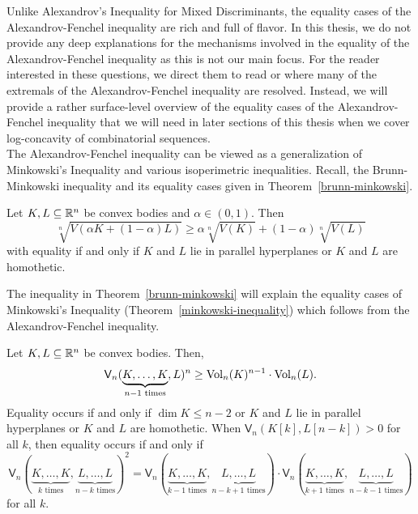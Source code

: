 \documentclass{puthesis-UG}
\begin{document}
Unlike Alexandrov's Inequality for Mixed Discriminants, the equality cases of the Alexandrov-Fenchel inequality are rich and full of flavor. In this thesis, we do not provide any deep explanations for the mechanisms involved in the equality of the Alexandrov-Fenchel inequality as this is not our main focus. For the reader interested in these questions, we direct them to read \cite{minkowski-quadratic-inequality} or \cite{shenfeld2022extremals} where many of the extremals of the Alexandrov-Fenchel inequality are resolved. Instead, we will provide a rather surface-level overview of the equality cases of the Alexandrov-Fenchel inequality that we will need in later sections of this thesis when we cover log-concavity of combinatorial sequences. \\

The Alexandrov-Fenchel inequality can be viewed as a generalization of Minkowski's Inequality and various isoperimetric inequalities. Recall, the Brunn-Minkowski inequality and its equality cases given in Theorem~\ref{brunn-minkowski}.
\begin{thm} \label{brunn-minkowski}
	Let $K, L \subseteq \mathbb{R}^n$ be convex bodies and $\alpha \in (0, 1)$. Then
	\[
		\sqrt[n]{V(\alpha K + (1-\alpha) L)} \geq \alpha \sqrt[n]{V(K)} + (1-\alpha) \sqrt[n]{V(L)}
	\]
	with equality if and only if $K$ and $L$ lie in parallel hyperplanes or $K$ and $L$ are homothetic. 
\end{thm}

The inequality in Theorem~\ref{brunn-minkowski} will explain the equality cases of Minkowski's Inequality (Theorem~\ref{minkowski-inequality}) which follows from the Alexandrov-Fenchel inequality.

\begin{thm} \label{minkowski-inequality}
	Let $K, L \subseteq \mathbb{R}^n$ be convex bodies. Then, 
	\[
		\mathsf{V}_n(\underbrace{K, \ldots, K}_{n-1 \text{ times}}, L)^n \geq \operatorname{Vol}_n(K)^{n-1} \cdot \operatorname{Vol}_n(L).
	\]
	Equality occurs if and only if $\dim K \leq n-2$ or $K$ and $L$ lie in parallel hyperplanes or $K$ and $L$ are homothetic. When $\mathsf{V}_n(K[k], L[n-k]) > 0$ for all $k$, then equality occurs if and only if 
	\[
		\mathsf{V}_n(\underbrace{K, \ldots, K}_{k \text{ times}}, \underbrace{L, \ldots, L}_{n-k \text{ times}})^2 = \mathsf{V}_n(\underbrace{K, \ldots, K}_{k-1 \text{ times}}, \underbrace{L, \ldots, L}_{n-k+1 \text{ times}}) \cdot \mathsf{V}_n(\underbrace{K, \ldots, K}_{k+1 \text{ times}}, \underbrace{L, \ldots, L}_{n-k-1 \text{ times}})
	\]
	for all $k$. 
\end{thm}
\end{document}

